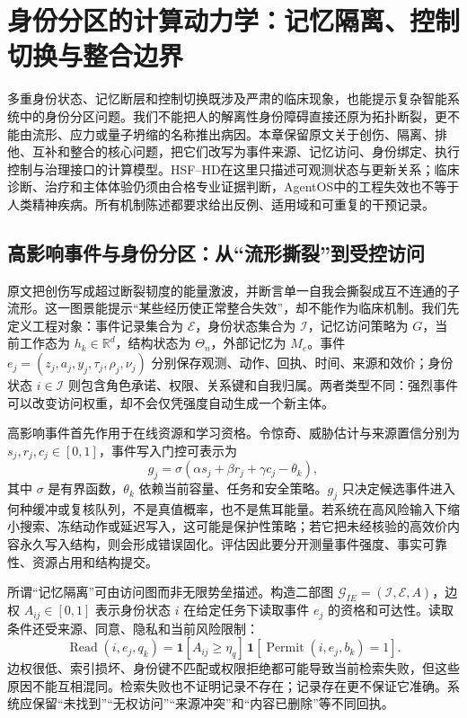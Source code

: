 \chapter{身份分区的计算动力学：记忆隔离、控制切换与整合边界}
\label{chp:pathology_did}
多重身份状态、记忆断层和控制切换既涉及严肃的临床现象，也能提示复杂智能系统中的身份分区问题。我们不能把人的解离性身份障碍直接还原为拓扑断裂，更不能由流形、应力或量子坍缩的名称推出病因。本章保留原文关于创伤、隔离、排他、互补和整合的核心问题，把它们改写为事件来源、记忆访问、身份绑定、执行控制与治理接口的计算模型。HSF--HD在这里只描述可观测状态与更新关系；临床诊断、治疗和主体体验仍须由合格专业证据判断，AgentOS中的工程失效也不等于人类精神疾病。所有机制陈述都要求给出反例、适用域和可重复的干预记录。

\section{高影响事件与身份分区：从“流形撕裂”到受控访问}
\label{sec:geometry_of_trauma}
原文把创伤写成超过断裂韧度的能量激波，并断言单一自我会撕裂成互不连通的子流形。这一图景能提示“某些经历使正常整合失效”，却不能作为临床机制。我们先定义工程对象：事件记录集合为 $\mathcal E$，身份状态集合为 $\mathcal I$，记忆访问策略为 $G$，当前工作态为 $h_k\in\mathbb R^d$，结构状态为 $\Theta_n$，外部记忆为 $M_e$。事件 $e_j=(z_j,a_j,y_j,\tau_j,\rho_j,\nu_j)$ 分别保存观测、动作、回执、时间、来源和效价；身份状态 $i\in\mathcal I$ 则包含角色承诺、权限、关系键和自我归属。两者类型不同：强烈事件可以改变访问权重，却不会仅凭强度自动生成一个新主体。

高影响事件首先作用于在线资源和学习资格。令惊奇、威胁估计与来源置信分别为 $s_j,r_j,c_j\in[0,1]$，事件写入门控可表示为
\[
g_j=\sigma(\alpha s_j+\beta r_j+\gamma c_j-\theta_k),
\]
其中 $\sigma$ 是有界函数，$\theta_k$ 依赖当前容量、任务和安全策略。$g_j$ 只决定候选事件进入何种缓冲或复核队列，不是真值概率，也不是焦耳能量。若系统在高风险输入下缩小搜索、冻结动作或延迟写入，这可能是保护性策略；若它把未经核验的高效价内容永久写入结构，则会形成错误固化。评估因此要分开测量事件强度、事实可靠性、资源占用和结构提交。

所谓“记忆隔离”可由访问图而非无限势垒描述。构造二部图 $\mathcal G_{IE}=(\mathcal I,\mathcal E,A)$，边权 $A_{ij}\in[0,1]$ 表示身份状态 $i$ 在给定任务下读取事件 $e_j$ 的资格和可达性。读取条件还受来源、同意、隐私和当前风险限制：
\[
\operatorname{Read}(i,e_j,q_k)=
\mathbf 1[A_{ij}\ge \eta_q]\,
\mathbf 1[\operatorname{Permit}(i,e_j,b_k)=1].
\]
边权很低、索引损坏、身份键不匹配或权限拒绝都可能导致当前检索失败，但这些原因不能互相混同。检索失败也不证明记录不存在；记录存在更不保证它准确。系统应保留“未找到”“无权访问”“来源冲突”和“内容已删除”等不同回执。

